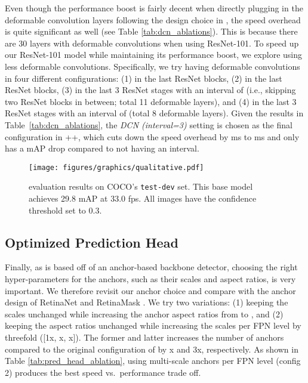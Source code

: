 \documentclass[10pt,journal,compsoc]{IEEEtran}
\begin{document}
Even though the performance boost is fairly decent when directly plugging in the deformable convolution layers following the design choice in \cite{deformv2}, the speed overhead is quite significant as well (see Table \ref{tab:dcn_ablations}). This is because there are 30 layers with deformable convolutions when using ResNet-101. To speed up our ResNet-101 model while maintaining its performance boost, we explore using less deformable convolutions.  Specifically, we try having deformable convolutions in four different configurations: (1) in the last  ResNet blocks, (2) in the last  ResNet blocks, (3) in the last 3 ResNet stages with an interval of  (i.e., skipping two ResNet blocks in between; total 11 deformable layers), and (4) in the last 3 ResNet stages with an interval of  (total 8 deformable layers).  Given the results in Table~\ref{tab:dcn_ablations}, the \textit{DCN (interval=3)} setting is chosen as the final configuration in \methodname++, which cuts down the speed overhead by  ms to  ms and only has a  mAP drop compared to not having an interval.







    \begin{figure*}
    \centering
    \texttt{[image: figures/graphics/qualitative.pdf]}
\caption{\textbf{\methodname} evaluation results on COCO's \texttt{test-dev} set. This base model achieves 29.8 mAP at 33.0 fps. All images have the confidence threshold set to 0.3.} \label{fig:qualitative}
\end{figure*}     
\subsection{Optimized Prediction Head}
Finally, as \methodname{} is based off of an anchor-based backbone detector, choosing the right hyper-parameters for the anchors, such as their scales and aspect ratios, is very important. We therefore revisit our anchor choice and compare with the anchor design of RetinaNet \cite{retinanet} and RetinaMask \cite{fu-retinamask2019}. We try two variations: (1) keeping the scales unchanged while increasing the anchor aspect ratios from  to , and (2) keeping the aspect ratios unchanged while increasing the scales per FPN level by threefold ([1x, x, x]). The former and latter increases the number of anchors compared to the original configuration of \methodname{} by x and 3x, respectively. As shown in Table \ref{tab:pred_head_ablation}, using multi-scale anchors per FPN level (config 2) produces the best speed vs.~performance trade off.
\end{document}
